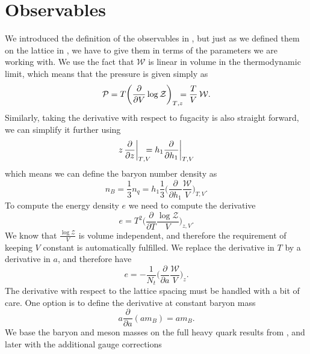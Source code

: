 \section{Observables}

We introduced the definition of the observables in , but
just as we defined them on the lattice in ,
we have to give them in terms of the parameters we are working with. We use the
fact that  $\mathcal{W}$ is linear in volume in the thermodynamic
limit, which means that the pressure is given simply as
%
\begin{equation}
  \mathcal{P} = T \bigg( \frac{\partial}{\partial V} \log \mathcal{Z}
  \bigg)_{T\mathrlap{,z}} = \frac{T}{V}\,\mathcal{W}.
\end{equation}
%
Similarly, taking the derivative with respect to fugacity is also straight
forward, we can simplify it further using
%
\begin{equation}
  z\, \frac{\partial}{\partial z} \bigg|_{T\mathrlap{,V}} = h_1
  \frac{\partial}{\partial h_1} \bigg|_{T,V}
\end{equation}
%
which means we can define the baryon number density as
%
\begin{equation}
  n_B = \frac{1}{3} n_q = h_1 \frac{1}{3} \bigg( \frac{\partial}{\partial h_1} \frac{\mathcal{W}}{V} \bigg)_{T,V}.
\end{equation}
%
To compute the energy density $e$ we need to compute the
derivative
%
\begin{equation}
  e = T^2 \bigg( \frac{\partial}{\partial T} \frac{\log \mathcal{Z}}{V}
    \bigg)_{z,V}.
\end{equation}
%
We know that $\frac{\log \mathcal{Z}}{V}$ is volume independent, and therefore
the requirement of keeping $V$ constant is automatically fulfilled. We replace
the derivative in $T$ by a derivative in $a$, and therefore have
%
\begin{equation}
  e = -\frac{1}{N_t} \bigg( \frac{\partial}{\partial a} \frac{\mathcal{W}}{V}
    \bigg)_z.
\end{equation}
%
The derivative with respect to the lattice spacing must be handled with a bit of
care. One option is to define the derivative at constant baryon mass
%
\begin{equation}
  a \frac{\partial}{\partial a} (a m_B) = a m_B.
\end{equation}
%
We base the baryon and meson masses on the full heavy quark results from
\citep{Smit:2002introduction}, and later with the additional gauge corrections

